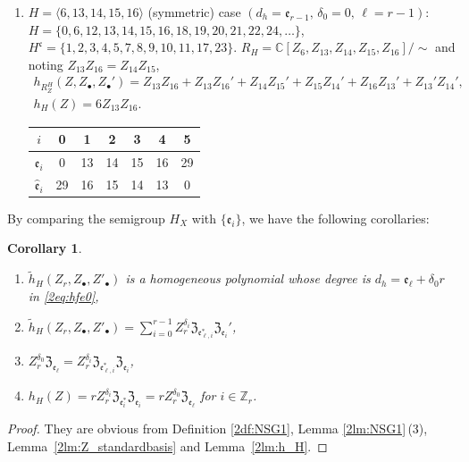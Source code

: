 \documentclass[pdftex]{sigma}
\def\CC{{\mathbb C}}
\def\ZZ{{\mathbb Z}}
\def\fZ{{\mathfrak Z}}
\def\fc{{\mathfrak c}}
\def\fe{{\mathfrak e}}
\def\th{{\widetilde h}}
\def\hfe{{\widehat{\mathfrak e}}}
\numberwithin{equation}{section}
\newtheorem{Corollary}[Theorem]{Corollary}
\begin{document}
\begin{Example}
\begin{enumerate}
\item $H=\langle 6, 13, 14, 15, 16\rangle$ (symmetric) case
$(d_h=\fe_{r-1},\, \delta_0=0, \, \ell=r-1)$:
$H = \{0, 6, 12, 13, 14, \allowbreak 15, 16, 18, 19, 20, 21, 22, 24, \dots\}$,
$H^\fc = \{1, 2, 3, 4, 5, 7, 8, 9, 10, 11, 17, 23\}$.
$R_H = \CC[Z_6, Z_{13},\allowbreak Z_{14}, Z_{15}, Z_{16}]/ {\sim} $ and noting
$Z_{13}Z_{16}=Z_{14}Z_{15}$,
\begin{gather*}
h_{{R_Z^H}}(Z, Z_\bullet, Z_\bullet')=
Z_{13}Z_{16} +Z_{13}Z_{16}'+Z_{14}Z_{15}'+Z_{15}Z_{14}'
+Z_{16}Z_{13}'+Z_{13}'Z_{14}',\\
h_H(Z) = 6 Z_{13}Z_{16}.
\end{gather*}
\begin{table}[htb]\centering
 \begin{tabular}{|c|cccccc|}
\hline
$i$&0&1&2&3&4&5\\
\hline
$\fe_i$ &0 &13 & 14& 15 &16 & 29\\
$\hfe_i$ &29 &16 & 15& 14 &13 & 0\\
\hline
 \end{tabular}
\end{table}\label{2tb:Ex6}
\end{enumerate}
\end{Example}

By comparing the semigroup $H_X$ with $\{\fe_i\}$, we have the following corollaries:

\begin{Corollary}\label{2cr:h_Hhomo}\quad
\begin{enumerate}\itemsep=0pt
\item[$(1)$] $\th_{H}(Z_r, Z_\bullet, Z'_\bullet)$ is a homogeneous polynomial whose degree is $d_h=\fe_\ell+\delta_0 r$ in \eqref{2eq:hfe0},

\item[$(2)$]
$\th_{H}(Z_r, Z_\bullet, Z'_\bullet)
=\sum_{i=0}^{r-1}
Z_r^{\delta_i} \fZ_{\fe_{\ell,i}^*} \fZ_{\fe_i}'$,

\item[$(3)$]
$Z_r^{\delta_0} \fZ_{\fe_\ell}=Z_r^{\delta_i} \fZ_{\fe_{\ell,i}^*} \fZ_{\fe_i}$,

\item[$(4)$]
$h_{H}(Z)=r Z_r^{\delta_i} \fZ_{\fe_i^*}\fZ_{\fe_i}= r Z_r^{\delta_0} \fZ_{\fe_\ell}$ for $i\in \ZZ_r$.
\end{enumerate}
\end{Corollary}

\begin{proof}
They are obvious from Definition \ref{2df:NSG1}, Lemma \ref{2lm:NSG1}\,(3),
 Lemma~\ref{2lm:Z_standardbasis} and Lemma~\ref{2lm:h_H}.
\end{proof}
\end{document}
